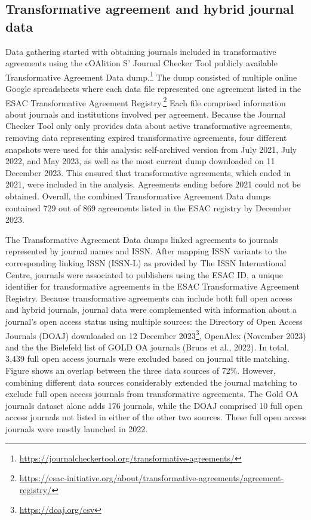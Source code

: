 \documentclass[a4paper,man,floatsintext,longtable,noextraspace,12pt]{apa6}
\begin{document}
\hypertarget{transformative-agreement-and-hybrid-journal-data}{%
\subsection{Transformative agreement and hybrid journal
data}\label{transformative-agreement-and-hybrid-journal-data}}

Data gathering started with obtaining journals included in
transformative agreements using the cOAlition S' Journal Checker Tool
publicly available Transformative Agreement Data dump.\footnote{\url{https://journalcheckertool.org/transformative-agreements/}}
The dump consisted of multiple online Google spreadsheets where each
data file represented one agreement listed in the ESAC Transformative
Agreement Registry.\footnote{\url{https://esac-initiative.org/about/transformative-agreements/agreement-registry/}}
Each file comprised information about journals and institutions involved
per agreement. Because the Journal Checker Tool only only provides data
about active transformative agreements, removing data representing
expired transformative agreements, four different snapshots were used
for this analysis: self-archived version from July 2021, July 2022, and
May 2023, as well as the most current dump downloaded on 11 December
2023. This ensured that transformative agreements, which ended in 2021,
were included in the analysis. Agreements ending before 2021 could not
be obtained. Overall, the combined Transformative Agreement Data dumps
contained 729 out of 869 agreements listed in the ESAC registry by
December 2023.

The Transformative Agreement Data dumps linked agreements to journals
represented by journal names and ISSN. After mapping ISSN variants to
the corresponding linking ISSN (ISSN-L) as provided by The ISSN
International Centre, journals were associated to publishers using the
ESAC ID, a unique identifier for transformative agreements in the ESAC
Transformative Agreement Registry. Because transformative agreements can
include both full open access and hybrid journals, journal data were
complemented with information about a journal's open access status using
multiple sources: the Directory of Open Access Journals (DOAJ)
downloaded on 12 December 2023\footnote{\url{https://doaj.org/csv}},
OpenAlex (November 2023) and the the Bielefeld list of GOLD OA journals
(Bruns et al., 2022). In total, 3,439 full open access journals were
excluded based on journal title matching. Figure shows an overlap
between the three data sources of 72\%. However, combining different
data sources considerably extended the journal matching to exclude full
open access journals from transformative agreements. The Gold OA
journals dataset alone adds 176 journals, while the DOAJ comprised 10
full open access journals not listed in either of the other two sources.
These full open access journals were mostly launched in 2022.
\end{document}
